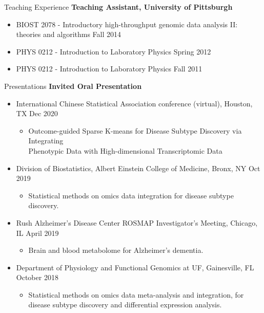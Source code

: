 \documentclass{resume} %
\begin{document}
\begin{rSection}{Teaching Experience }
\textbf{Teaching Assistant, University of Pittsburgh}
\begin{itemize}[noitemsep,topsep=0pt]
\item BIOST 2078 - Introductory high-throughput genomic data analysis II: \\theories and algorithms \hfill {Fall 2014}
\item PHYS 0212 - Introduction to Laboratory Physics \hfill {Spring 2012}
\item PHYS 0212 - Introduction to Laboratory Physics \hfill {Fall 2011}
\end{itemize}

\end{rSection}

\begin{rSection}{Presentations}
\textbf{Invited Oral Presentation}

\begin{itemize}[noitemsep,topsep=0pt]

\item  International Chinese Statistical Association conference (virtual), Houston, TX  \hfill {Dec 2020}
\begin{itemize}[noitemsep,topsep=0pt]
\item{Outcome-guided Sparse K-means for Disease Subtype Discovery via Integrating \\Phenotypic Data with High-dimensional Transcriptomic Data}
\end{itemize}

\item  Division of Biostatistics,  Albert Einstein College of Medicine, Bronx, NY  \hfill {Oct 2019}
\begin{itemize}[noitemsep,topsep=0pt]
\item{Statistical methods on omics data integration for disease subtype discovery.}
\end{itemize}

\item  Rush Alzheimer's Disease Center ROSMAP Investigator's Meeting, Chicago, IL  \hfill {April 2019}
\begin{itemize}[noitemsep,topsep=0pt]
\item{Brain and blood metabolome for Alzheimer's dementia.}
\end{itemize}

\item  Department of Physiology and Functional Genomics at UF, Gainesville, FL  \hfill {October 2018}
\begin{itemize}[noitemsep,topsep=0pt]
\item{Statistical methods on omics data meta-analysis and integration, for \\
disease subtype discovery and differential expression analysis.}
\end{itemize}


\end{itemize}
\end{rSection}
\end{document}
